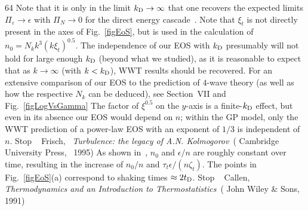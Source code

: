 \documentclass[prl,aps,twocolumn, a4paper,longbibliography,superscriptaddress]{revtex4-2}
\begin{document}
\begin{thebibliography}{64}
{
  \BibitemOpen
   {Note that it is only in the limit $k_{\protect \textrm
  {D}}\rightarrow \infty $ that one recovers the expected limits $\Pi
  _\varepsilon \rightarrow \epsilon $ with $\Pi _N\rightarrow 0$ for the direct
  energy cascade~\cite {Dyachenko:1992}.}
  \BibitemOpen
   {Note that $\xi _t$ is not directly present in the axes of
  Fig.~\ref {figEoS}, but is used in the calculation of $n_0=N_kk^{3}(k\xi
  _t)^{0.5}$.}
  \BibitemOpen
   {{The independence of our EOS with $k_{\protect \textrm {D}}$
  presumably will not hold for large enough $k_{\protect \textrm {D}}$ (beyond
  what we studied), as it is reasonable to expect that as $k\rightarrow \infty
  $ (with $k<k_{\protect \textrm {D}}$), WWT results should be
  recovered.}}
  \BibitemOpen
   {For an extensive comparison of our EOS to the prediction of
  $4$-wave theory (as well as how the respective $N_k$ can be deduced), see
  Section~VII and Fig.~\ref {figLogVsGamma}}
  \BibitemOpen
   {The factor of $\xi ^{0.5}$ on the $y$-axis is a
  finite-$k_{\protect \textrm {D}}$ effect, but even in its absence our EOS
  would depend on $n$; within the GP model, only the WWT prediction of a
  power-law EOS with an exponent of $1/3$ is independent of $n$.}\BibitemShut
  {Stop}
  \BibitemOpen
   { {~\bibnamefont
  {Frisch}},\ }\href@noop {} {\emph { {Turbulence: the legacy
  of {A.N. Kolmogorov}}}}\ ( {Cambridge University
  Press},\  {1995})
  \BibitemOpen
   {As shown in~\cite {Supplementary}, $n_0$ and $\epsilon /n$
  are roughly constant over time, resulting in the increase of $n_0/n$ and
  $\tau _t\epsilon /(n\zeta _t)$. The points in Fig.~\ref {figEoS}(a)
  correspond to shaking times $\approx 2t_{\protect \textrm {D}}$.}\BibitemShut
  {Stop}
  \BibitemOpen
   { {\ \bibnamefont
  {Callen}},\ }\href@noop {} {\emph { {Thermodynamics and an
  Introduction to Thermostatistics}}}\ ( {John Wiley \&
  Sons},\  {1991})
}
\end{thebibliography}
\end{document}
